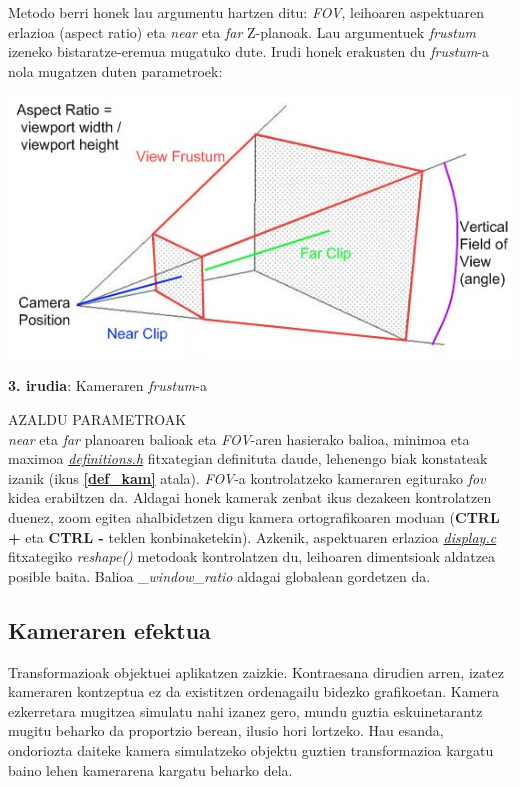 \documentclass[12pt]{article}
\newcommand{\fitxategi}[1] {\underline{\textit{#1}}}
\newcommand{\metodo}[1] {\textit{#1}}
\newcommand{\aldagai}[1] {\textit{#1}}
\newcommand{\tekla}[1] {\textbf{#1}}
\newcommand{\erref}[1] {\textbf{\ref{#1}}}
\begin{document}
Metodo berri honek lau argumentu hartzen ditu: \textit{FOV}, leihoaren aspektuaren erlazioa (aspect ratio)\cite{aspect_ratio} eta \textit{near} eta \textit{far} Z-planoak\cite{near_far}. Lau argumentuek \textit{frustum}\cite{frustum} izeneko bistaratze-eremua mugatuko dute. Irudi honek erakusten du \textit{frustum}-a nola mugatzen duten parametroek:

\begin{center}
\includegraphics[scale=0.8]{kamera_frustum.jpg}

\textbf{3. irudia}: Kameraren \textit{frustum}-a
\end{center}

AZALDU PARAMETROAK\\

\textit{near} eta \textit{far} planoaren balioak eta \textit{FOV}-aren hasierako balioa, minimoa eta maximoa \fitxategi{definitions.h} fitxategian definituta daude, lehenengo biak konstateak izanik (ikus \erref{def_kam} atala). \textit{FOV}-a kontrolatzeko kameraren egiturako \aldagai{fov} kidea erabiltzen da. Aldagai honek kamerak zenbat ikus dezakeen kontrolatzen duenez, zoom egitea ahalbidetzen digu kamera ortografikoaren moduan (\tekla{CTRL +} eta \tekla{CTRL -} teklen konbinaketekin). Azkenik, aspektuaren erlazioa \fitxategi{display.c} fitxategiko \metodo{reshape()} metodoak kontrolatzen du, leihoaren dimentsioak aldatzea posible baita. Balioa \aldagai{\_window\_ratio} aldagai globalean gordetzen da.


\subsection{Kameraren efektua}\label{kam_sim}

Transformazioak objektuei aplikatzen zaizkie. Kontraesana dirudien arren, izatez kameraren kontzeptua ez da existitzen ordenagailu bidezko grafikoetan. Kamera ezkerretara mugitzea simulatu nahi izanez gero, mundu guztia eskuinetarantz mugitu beharko da proportzio berean, ilusio hori lortzeko. Hau esanda, ondoriozta daiteke kamera simulatzeko objektu guztien transformazioa kargatu baino lehen kamerarena kargatu beharko dela.
\end{document}

